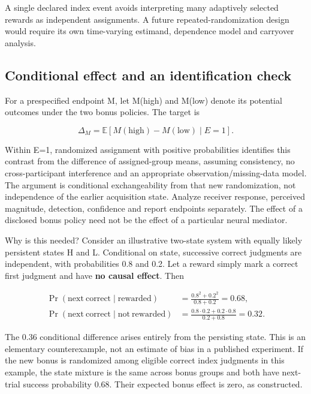 \documentclass[
  american,
  11pt,
  letterpaper,
]{article}
\begin{document}
A single declared index event avoids interpreting many adaptively selected rewards as independent assignments. A future repeated-randomization design would require its own time-varying estimand, dependence model and carryover analysis.

\subsection{Conditional effect and an identification check}\label{conditional-effect-and-an-identification-check}

For a prespecified endpoint M, let M(high) and M(low) denote its potential outcomes under the two bonus policies. The target is

\[\Delta_M=\mathbb E[M(\mathrm{high})-M(\mathrm{low})\mid E=1].\]

Within E=1, randomized assignment with positive probabilities identifies this contrast from the difference of assigned-group means, assuming consistency, no cross-participant interference and an appropriate observation/missing-data model. The argument is conditional exchangeability from that new randomization, not independence of the earlier acquisition state. Analyze receiver response, perceived magnitude, detection, confidence and report endpoints separately. The effect of a disclosed bonus policy need not be the effect of a particular neural mediator.

Why is this needed? Consider an illustrative two-state system with equally likely persistent states H and L. Conditional on state, successive correct judgments are independent, with probabilities 0.8 and 0.2. Let a reward simply mark a correct first judgment and have \textbf{no causal effect}. Then

\[\begin{aligned}\Pr(\mathrm{next\ correct}\mid\mathrm{rewarded})&=\frac{0.8^2+0.2^2}{0.8+0.2}=0.68,\\\Pr(\mathrm{next\ correct}\mid\mathrm{not\ rewarded})&=\frac{0.8\cdot0.2+0.2\cdot0.8}{0.2+0.8}=0.32.\end{aligned}\]

The 0.36 conditional difference arises entirely from the persisting state. This is an elementary counterexample, not an estimate of bias in a published experiment. If the new bonus is randomized among eligible correct index judgments in this example, the state mixture is the same across bonus groups and both have next-trial success probability 0.68. Their expected bonus effect is zero, as constructed.
\end{document}
